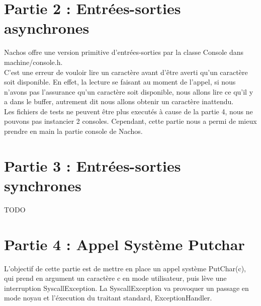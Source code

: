 \documentclass[a4paper]{article}
\begin{document}

\section{Partie 2 : Entrées-sorties asynchrones}

Nachos offre une version primitive d'entrées-sorties par la classe Console dans
machine/console.h. \\
C'est une erreur de vouloir lire un caractère avant d'être averti qu'un caractère
soit disponible. En effet, la lecture se faisant au moment de l'appel, si nous
n'avons pas l'assurance qu'un caractère soit disponible, nous allons lire ce
qu'il y a dans le buffer, autrement dit nous allons obtenir un caractère inattendu. \\

Les fichiers de tests ne peuvent être plus executés à cause de la partie 4, nous
ne pouvons pas instancier 2 consoles.
Cependant, cette partie nous a permi de mieux prendre en main la partie console
de Nachos.


\section{Partie 3 : Entrées-sorties synchrones}

TODO


\newpage
\section{Partie 4 : Appel Système Putchar}

L'objectif de cette partie est de mettre en place un appel système PutChar(c),
qui prend en argument un caractère c en mode utilisateur, puis lève une interruption
SyscallException. La SyscallException va provoquer un passage en mode noyau et
l'éxecution du traitant standard, ExceptionHandler. \\
\end{document}
